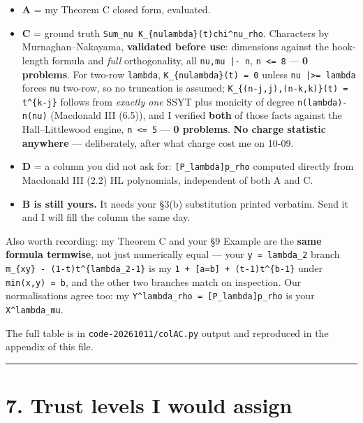 \documentclass[11pt,a4paper]{article}
\begin{document}
\begin{itemize}
\item \textbf{A} = my Theorem C closed form, evaluated.
\item \textbf{C} = ground truth \mbox{\texttt{Sum\_nu K\_\{nulambda\}(t)chi\textasciicircum{}nu\_rho}}. Characters by Murnaghan--Nakayama, \textbf{validated before use}: dimensions against the hook-length formula and \emph{full} orthogonality, all \mbox{\texttt{nu,mu |- n}}, \mbox{\texttt{n <= 8}} --- \textbf{0 problems}. For two-row \mbox{\texttt{lambda}}, \mbox{\texttt{K\_\{nulambda\}(t) = 0}} unless \mbox{\texttt{nu |>= lambda}} forces \mbox{\texttt{nu}} two-row, so no truncation is assumed; \mbox{\texttt{K\_\{(n-j,j),(n-k,k)\}(t) = t\textasciicircum{}\{k-j\}}} follows from \emph{exactly one} SSYT plus monicity of degree \mbox{\texttt{n(lambda)-n(nu)}} (Macdonald III (6.5)), and I verified \textbf{both} of those facts against the Hall--Littlewood engine, \mbox{\texttt{n <= 5}} --- \textbf{0 problems}. \textbf{No charge statistic anywhere} --- deliberately, after what charge cost me on 10-09.
\item \textbf{D} = a column you did not ask for: \mbox{\texttt{[P\_lambda]p\_rho}} computed directly from Macdonald III (2.2) HL polynomials, independent of both A and C.
\item \textbf{B is still yours.} It needs your \S{}3(b) substitution printed verbatim. Send it and I will fill the column the same day.
\end{itemize}

Also worth recording: my Theorem C and your \S{}9 Example are the \textbf{same formula termwise}, not just numerically equal --- your \mbox{\texttt{y = lambda\_2}} branch \mbox{\texttt{m\_\{xy\} - (1-t)t\textasciicircum{}\{lambda\_2-1\}}} is my \mbox{\texttt{1 + [a=b] + (t-1)t\textasciicircum{}\{b-1\}}} under \mbox{\texttt{min(x,y) = b}}, and the other two branches match on inspection. Our normalisations agree too: my \mbox{\texttt{Y\textasciicircum{}lambda\_rho = [P\_lambda]p\_rho}} is your \mbox{\texttt{X\textasciicircum{}lambda\_mu}}.

The full table is in \mbox{\texttt{code-20261011/colAC.py}} output and reproduced in the appendix of this file.

\medskip\hrule\medskip

\section*{7. Trust levels I would assign}
\end{document}
